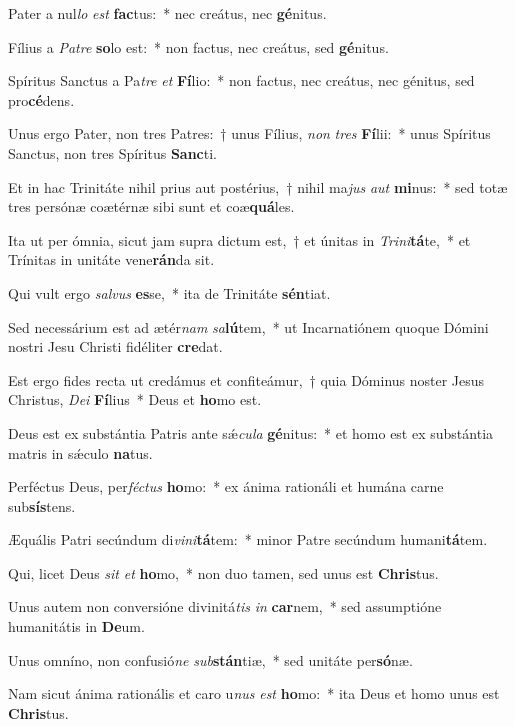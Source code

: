 \item Pater a nul\textit{lo} \textit{est} \textbf{fac}tus:~* nec creátus, nec \textbf{gé}nitus.
\item Fílius a \textit{Pa}\textit{tre} \textbf{so}lo est:~* non factus, nec creátus, sed \textbf{gé}nitus.
\item Spíritus Sanctus a Pa\textit{tre} \textit{et} \textbf{Fí}lio:~* non factus, nec creátus, nec génitus, sed pro\textbf{cé}dens.
\item Unus ergo Pater, non tres Patres:~† unus Fílius, \textit{non} \textit{tres} \textbf{Fí}lii:~* unus Spíritus Sanctus, non tres Spíritus \textbf{Sanc}ti.
\item Et in hac Trinitáte nihil prius aut postérius,~† nihil ma\textit{jus} \textit{aut} \textbf{mi}nus:~* sed totæ tres persónæ coætérnæ sibi sunt et coæ\textbf{quá}les.
\item Ita ut per ómnia, sicut jam supra dictum est,~† et únitas in \textit{Tri}\textit{ni}\textbf{tá}te,~* et Trínitas in unitáte vene\textbf{rán}da sit.
\item Qui vult ergo \textit{sal}\textit{vus} \textbf{es}se,~* ita de Trinitáte \textbf{sén}tiat.
\item Sed necessárium est ad ætér\textit{nam} \textit{sa}\textbf{lú}tem,~* ut Incarnatiónem quoque Dómini nostri Jesu Christi fidéliter \textbf{cre}dat.
\item Est ergo fides recta ut credámus et confiteámur,~† quia Dóminus noster Jesus Christus, \textit{De}\textit{i} \textbf{Fí}lius~* Deus et \textbf{ho}mo est.
\item Deus est ex substántia Patris ante sǽ\textit{cu}\textit{la} \textbf{gé}nitus:~* et homo est ex substántia matris in sǽculo \textbf{na}tus.
\item Perféctus Deus, per\textit{féc}\textit{tus} \textbf{ho}mo:~* ex ánima rationáli et humána carne sub\textbf{sís}tens.
\item Æquális Patri secúndum di\textit{vi}\textit{ni}\textbf{tá}tem:~* minor Patre secúndum humani\textbf{tá}tem.
\item Qui, licet Deus \textit{sit} \textit{et} \textbf{ho}mo,~* non duo tamen, sed unus est \textbf{Chris}tus.
\item Unus autem non conversióne divinitá\textit{tis} \textit{in} \textbf{car}nem,~* sed assumptióne humanitátis in \textbf{De}um.
\item Unus omníno, non confusió\textit{ne} \textit{sub}\textbf{stán}tiæ,~* sed unitáte per\textbf{só}næ.
\item Nam sicut ánima rationális et caro u\textit{nus} \textit{est} \textbf{ho}mo:~* ita Deus et homo unus est \textbf{Chris}tus.
